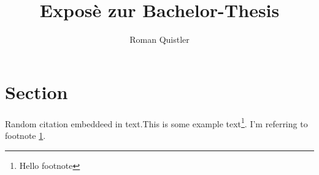 \documentclass[11pt]{scrartcl}
\title{Exposè zur Bachelor-Thesis}
\author{Roman Quistler}
\begin{document}
	
	
	
	\newpage
	\tableofcontents
	\newpage
	
	\section{Section}
	\label{sec:einleitende-worte}
		
	Random citation \autocite[1]{DUMMY:1} embeddeed in text.This is some example text\footnote{\label{myfootnote}Hello footnote}.
	I'm referring to footnote \ref{myfootnote}.
	
	\newpage
		
	\begin{appendix}
		\listoffigures
	\end{appendix}
	
	\printbibliography
		
\end{document}
